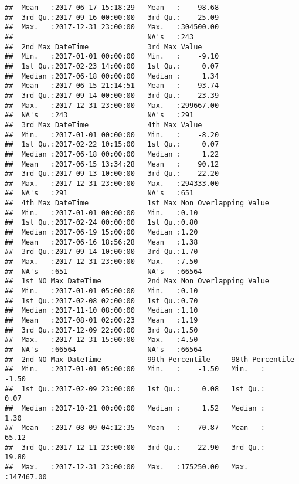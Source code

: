 \documentclass[]{article}
\begin{document}
\begin{verbatim}
##  Mean   :2017-06-17 15:18:29   Mean   :    98.68  
##  3rd Qu.:2017-09-16 00:00:00   3rd Qu.:    25.09  
##  Max.   :2017-12-31 23:00:00   Max.   :304500.00  
##                                NA's   :243        
##  2nd Max DateTime              3rd Max Value      
##  Min.   :2017-01-01 00:00:00   Min.   :    -9.10  
##  1st Qu.:2017-02-23 14:00:00   1st Qu.:     0.07  
##  Median :2017-06-18 00:00:00   Median :     1.34  
##  Mean   :2017-06-15 21:14:51   Mean   :    93.74  
##  3rd Qu.:2017-09-14 00:00:00   3rd Qu.:    23.39  
##  Max.   :2017-12-31 23:00:00   Max.   :299667.00  
##  NA's   :243                   NA's   :291        
##  3rd Max DateTime              4th Max Value      
##  Min.   :2017-01-01 00:00:00   Min.   :    -8.20  
##  1st Qu.:2017-02-22 10:15:00   1st Qu.:     0.07  
##  Median :2017-06-18 00:00:00   Median :     1.22  
##  Mean   :2017-06-15 13:34:28   Mean   :    90.12  
##  3rd Qu.:2017-09-13 10:00:00   3rd Qu.:    22.20  
##  Max.   :2017-12-31 23:00:00   Max.   :294333.00  
##  NA's   :291                   NA's   :651        
##  4th Max DateTime              1st Max Non Overlapping Value
##  Min.   :2017-01-01 00:00:00   Min.   :0.10                 
##  1st Qu.:2017-02-24 00:00:00   1st Qu.:0.80                 
##  Median :2017-06-19 15:00:00   Median :1.20                 
##  Mean   :2017-06-16 18:56:28   Mean   :1.38                 
##  3rd Qu.:2017-09-14 10:00:00   3rd Qu.:1.70                 
##  Max.   :2017-12-31 23:00:00   Max.   :7.50                 
##  NA's   :651                   NA's   :66564                
##  1st NO Max DateTime           2nd Max Non Overlapping Value
##  Min.   :2017-01-01 05:00:00   Min.   :0.10                 
##  1st Qu.:2017-02-08 02:00:00   1st Qu.:0.70                 
##  Median :2017-11-10 08:00:00   Median :1.10                 
##  Mean   :2017-08-01 02:00:23   Mean   :1.19                 
##  3rd Qu.:2017-12-09 22:00:00   3rd Qu.:1.50                 
##  Max.   :2017-12-31 15:00:00   Max.   :4.50                 
##  NA's   :66564                 NA's   :66564                
##  2nd NO Max DateTime           99th Percentile     98th Percentile    
##  Min.   :2017-01-01 05:00:00   Min.   :    -1.50   Min.   :    -1.50  
##  1st Qu.:2017-02-09 23:00:00   1st Qu.:     0.08   1st Qu.:     0.07  
##  Median :2017-10-21 00:00:00   Median :     1.52   Median :     1.30  
##  Mean   :2017-08-09 04:12:35   Mean   :    70.87   Mean   :    65.12  
##  3rd Qu.:2017-12-11 23:00:00   3rd Qu.:    22.90   3rd Qu.:    19.80  
##  Max.   :2017-12-31 23:00:00   Max.   :175250.00   Max.   :147467.00  

\end{verbatim}
\end{document}
